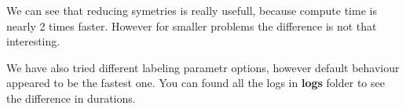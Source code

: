 \documentclass[a4paper]{article}
\theoremstyle{definition}
\theoremstyle{remark}
\newcommand{\ccc}[1]{{\mbox{\fontfamily{lmtt}\selectfont\textbf{#1}}}}
\begin{document}
We can see that reducing symetries is really usefull, because 
compute time is nearly 2 times faster. However for smaller 
problems the difference is not that interesting.

We have also tried different labeling parametr options, however
default behaviour appeared to be the fastest one. You can found all the logs
in \ccc{logs} folder to see the difference in durations.
\end{document}

